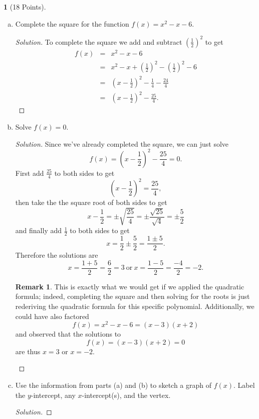\documentclass[12pt]{amsart}
\theoremstyle{definition}
\newtheorem{thm}{}
\theoremstyle{definition}
\newtheorem{rmk}{Remark}
\begin{document}
\begin{thm}[18 Points]\label{ex10}
  \begin{enumerate}[(a)]
  \item
    Complete the square for the function $f(x) = x^2 - x - 6$.
    \begin{proof}[Solution]
      To complete the square we add and subtract $\left(\frac{1}{2}\right)^2$ to get
      \begin{eqnarray*}
        f(x) &=& x^2 - x - 6\\
        &=& x^2 - x + \left(\frac{1}{2}\right)^2 - \left(\frac{1}{2}\right)^2 - 6\\
        &=& \left(x - \frac{1}{2}\right)^2 - \frac{1}{4} - \frac{24}{4}\\
        &=& \left(x - \frac{1}{2}\right)^2 - \frac{25}{4}.
      \end{eqnarray*}
    \end{proof}
  \item
    Solve $f(x) = 0$.
    \begin{proof}[Solution]
      Since we've already completed the square, we can just solve
      $$f(x) = \left(x - \frac{1}{2}\right)^2 - \frac{25}{4} = 0.$$
      First add $\frac{25}{4}$ to both sides to get
      $$\left(x - \frac{1}{2}\right)^2 = \frac{25}{4},$$
      then take the the square root of both sides to get
      $$x - \frac{1}{2} = \pm \sqrt{\frac{25}{4}} = \pm \frac{\sqrt{25}}{\sqrt{4}} = \pm \frac{5}{2}$$
      and finally add $\frac{1}{2}$ to both sides to get
      $$x = \frac{1}{2} \pm \frac{5}{2} = \frac{1 \pm 5}{2}.$$
      Therefore the solutions are
      $$x = \frac{1 + 5}{2} = \frac{6}{2} = 3\ \text{or}\ x = \frac{1 - 5}{2} = \frac{-4}{2} = -2.$$
      \begin{rmk}
        This is exactly what we would get if we applied the quadratic formula; indeed, completing the square and then solving for the roots is just rederiving the quadratic formula for this specific polynomial.
        Additionally, we could have also factored
        $$f(x) = x^2 - x - 6 = (x - 3)(x + 2)$$
        and observed that the solutions to 
        $$f(x) = (x - 3)(x + 2) = 0$$
        are thus $x = 3$ or $x = -2$.
      \end{rmk}
    \end{proof}
  \item
    Use the information from parts (a) and (b) to sketch a graph of $f(x)$.
    Label the $y$-intercept, any $x$-intercept(s), and the vertex.
    \begin{proof}[Solution]

\end{proof}
\end{enumerate}
\end{thm}
\end{document}
